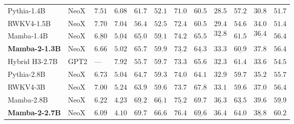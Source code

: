 \begin{table}[!ht]
{\begin{tabular}{@{}llllllllllll@{}}
      Pythia-1.4B                    & NeoX        & $7.51$             & $6.08$             & $61.7$             & $52.1$             & $71.0$             & $60.5$             & $28.5$               & $57.2$             & $30.8$               & $51.7$ \\
      RWKV4-1.5B                     & NeoX        & $7.70$             & $7.04$             & $56.4$             & $52.5$             & $72.4$             & $60.5$             & $29.4$               & $54.6$             & $34.0$               & $51.4$ \\
      Mamba-1.4B                     & NeoX        & $\underline{6.80}$ & $\underline{5.04}$ & $\underline{65.0}$ & $\underline{59.1}$ & $\mathbf{74.2}$    & $\mathbf{65.5}$    & $$\underline{32.8}$$ & $\mathbf{61.5}$    & $$\underline{36.4}$$ & $\mathbf{56.4}$ \\
      \textbf{Mamba-2-1.3B}          & NeoX        & $\mathbf{6.66}$    & $\mathbf{5.02}$    & $\mathbf{65.7}$    & $\mathbf{59.9}$    & $\underline{73.2}$ & $\underline{64.3}$ & $\mathbf{33.3}$      & $\underline{60.9}$ & $\mathbf{37.8}$      & $\mathbf{56.4}$ \\
      \midrule
      Hybrid H3-2.7B                 & GPT2        & ---                  & $7.92$             & $55.7$             & $59.7$             & $73.3$             & $65.6$             & $32.3$               & $61.4$             & $33.6$               & $54.5$ \\
      Pythia-2.8B                    & NeoX        & $6.73$             & $5.04$             & $64.7$             & $59.3$             & $74.0$             & $64.1$             & $32.9$               & $59.7$             & $35.2$               & $55.7$ \\
      RWKV4-3B                       & NeoX        & $7.00$             & $5.24$             & $63.9$             & $59.6$             & $73.7$             & $67.8$             & $33.1$               & $59.6$             & $37.0$               & $56.4$ \\
      Mamba-2.8B                     & NeoX        & $\underline{6.22}$ & $\underline{4.23}$ & $\underline{69.2}$ & $\underline{66.1}$ & $\underline{75.2}$ & $\mathbf{69.7}$    & $\underline{36.3}$   & $\underline{63.5}$ & $\mathbf{39.6}$      & $\underline{59.9}$ \\
      \textbf{Mamba-2-2.7B}          & NeoX        & $\mathbf{6.09}$    & $\mathbf{4.10}$    & $\mathbf{69.7}$    & $\mathbf{66.6}$    & $\mathbf{76.4}$    & $\underline{69.6}$ & $\mathbf{36.4}$      & $\mathbf{64.0}$    & $\underline{38.8}$   & $\mathbf{60.2}$ \\
      \bottomrule
    \end{tabular}
  }
  \label{table:downstream_zeroshot}
\end{table}




